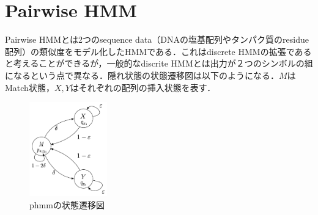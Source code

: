 %
%

\def\ba{\bm{a}}
\def\bb{\bm{b}}
\def\bc{\bm{c}}
\def\bd{\bm{d}}
\def\be{\bm{e}}
\def\bg{\bm{g}}
\def\bh{\bm{h}}
\def\bi{\bm{i}}
\def\bj{\bm{j}}
\def\bk{\bm{k}}
\def\bl{\bm{l}}
\def\bn{\bm{n}}
\def\bo{\bm{o}}
\def\bp{\bm{p}}
\def\bq{\bm{q}}
\def\br{\bm{r}}
\def\bs{\bm{s}}
\def\bt{\bm{t}}
\def\bu{\bm{u}}
\def\bv{\bm{v}}
\def\bw{\bm{w}}
\def\bx{\bm{x}}
\def\by{\bm{y}}
\def\bz{\bm{z}}

\def\bA{\bm{A}}
\def\bB{\bm{B}}
\def\bC{\bm{C}}
\def\bD{\bm{D}}
\def\bE{\bm{E}}
\def\bF{\bm{F}}
\def\bG{\bm{G}}
\def\bH{\bm{H}}
\def\bI{\bm{I}}
\def\bJ{\bm{J}}
\def\bK{\bm{K}}
\def\bL{\bm{L}}
\def\bM{\bm{M}}
\def\bN{\bm{N}}
\def\bO{\bm{O}}
\def\bP{\bm{P}}
\def\bQ{\bm{Q}}
\def\bR{\bm{R}}
\def\bS{\bm{S}}
\def\bT{\bm{T}}
\def\bU{\bm{U}}
\def\bV{\bm{V}}
\def\bW{\bm{W}}
\def\bX{\bm{X}}
\def\bY{\bm{Y}}
\def\bZ{\bm{Z}}

\section{Pairwise HMM}
\label{sec:phmm}
Pairwise HMMとは2つのsequence data（DNAの塩基配列やタンパク質のresidue配列）の類似度をモデル化したHMMである．これはdiscrete HMMの拡張であると考えることができるが，一般的なdiscrite HMMとは出力が２つのシンボルの組になるという点で異なる．隠れ状態の状態遷移図は以下のようになる．$M$はMatch状態，$X,Y$はそれぞれの配列の挿入状態を表す．

\begin{figure}[hc]
  \centering
  \includegraphics[width=0.3\textwidth, bb=0 0 300 400]{graffe/phmm_simple.pdf}  
  \caption{phmmの状態遷移図}
\end{figure}

